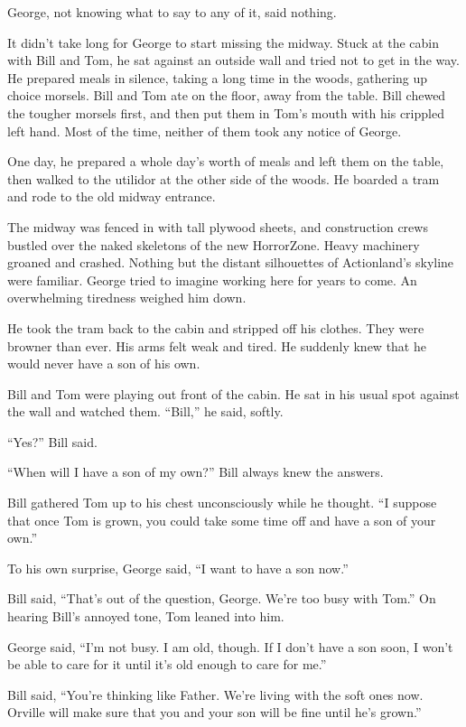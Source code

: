 George, not knowing what to say to any of it, said nothing.

\tb

It didn't take long for George to start missing the midway. Stuck
at the cabin with Bill and Tom, he sat against an outside wall and
tried not to get in the way. He prepared meals in silence, taking a
long time in the woods, gathering up choice morsels. Bill and Tom
ate on the floor, away from the table. Bill chewed the tougher
morsels first, and then put them in Tom's mouth with his crippled
left hand. Most of the time, neither of them took any notice of
George.

One day, he prepared a whole day's worth of meals and left them on
the table, then walked to the utilidor at the other side of the
woods. He boarded a tram and rode to the old midway entrance.

The midway was fenced in with tall plywood sheets, and construction
crews bustled over the naked skeletons of the new HorrorZone. Heavy
machinery groaned and crashed. Nothing but the distant silhouettes
of Actionland's skyline were familiar. George tried to imagine
working here for years to come. An overwhelming tiredness weighed
him down.

He took the tram back to the cabin and stripped off his clothes.
They were browner than ever. His arms felt weak and tired. He
suddenly knew that he would never have a son of his own.

Bill and Tom were playing out front of the cabin. He sat in his
usual spot against the wall and watched them. ``Bill,'' he said,
softly.

``Yes?'' Bill said.

``When will I have a son of my own?'' Bill always knew the
answers.

Bill gathered Tom up to his chest unconsciously while he thought.
``I suppose that once Tom is grown, you could take some time off and have a son 
of your own.''

To his own surprise, George said, ``I want to have a son now.''

Bill said,
``That's out of the question, George. We're too busy with Tom.'' On
hearing Bill's annoyed tone, Tom leaned into him.

George said,
``I'm not busy. I am old, though. If I don't have a son soon, I won't be able 
to care for it until it's old enough to care for me.''

Bill said,
``You're thinking like Father. We're living with the soft ones now. Orville 
will make sure that you and your son will be fine until he's grown.''

